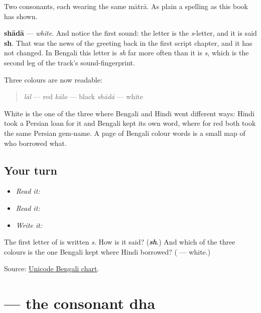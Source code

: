 Two consonants, each wearing the same mātrā. As plain a spelling as this book has shown.

\textbf{shādā} — \emph{white}. And notice the first sound: the letter is the \emph{s}-letter, and it is said \textbf{sh}. That was the news of the greeting back in the first script chapter, and it has not changed. In Bengali this letter is \emph{sh} far more often than it is \emph{s}, which is the second leg of the track's sound-fingerprint.

Three colours are now readable:

\begin{quote}
\textbf{} \emph{lāl} — red \textbf{} \emph{kālo} — black \textbf{} \emph{shādā} — white
\end{quote}

White is the one of the three where Bengali and Hindi went different ways: Hindi took a Persian loan for it and Bengali kept its own word, where for red both took the same Persian gem-name. A page of Bengali colour words is a small map of who borrowed what.

\subsection*{Your turn}
\begin{itemize}
\raggedright
  \item \emph{Read it:} 
  \item \emph{Read it:}   
  \item \emph{Write it:} 
\end{itemize}

\begin{tcolorbox}[breakable,colback=teal!4,colframe=teal!35!black,title={Before you move on}]
The first letter of \textbf{} is written \emph{s}. How is it said? (\emph{\textbf{sh}}.) And which of the three colours is the one Bengali kept where Hindi borrowed? (\textbf{} — white.)

Source: \href{https://www.unicode.org/charts/PDF/U0980.pdf}{Unicode Bengali chart}.
\end{tcolorbox}
\section[dhô]{ — the consonant dha}

\label{lesson:BN-W03-dha}




